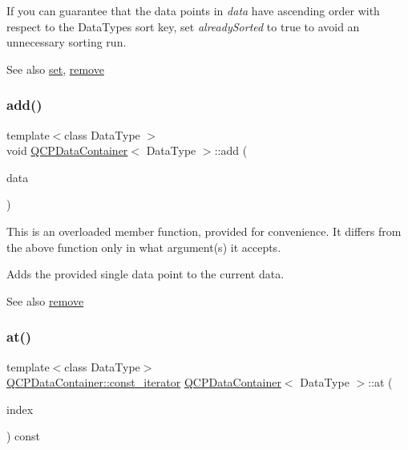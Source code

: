 If you can guarantee that the data points in {\itshape data} have ascending order with respect to the Data\+Type\textquotesingle{}s sort key, set {\itshape already\+Sorted} to true to avoid an unnecessary sorting run.

\begin{DoxySeeAlso}{See also}
\mbox{\hyperlink{class_q_c_p_data_container_ae7042bd534fc3ce7befa2ce3f790b5bf}{set}}, \mbox{\hyperlink{class_q_c_p_data_container_ae5f569a120648b167efa78835f12fd38}{remove}} 
\end{DoxySeeAlso}
\mbox{\label{class_q_c_p_data_container_a715e8e9972466804954a2f8fbd5288b7}} 
\subsubsection{\texorpdfstring{add()}{add()}\hspace{0.1cm}{\footnotesize\ttfamily [3/3]}}
{\footnotesize\ttfamily template$<$class Data\+Type $>$ \\
void \mbox{\hyperlink{class_q_c_p_data_container}{Q\+C\+P\+Data\+Container}}$<$ Data\+Type $>$\+::add (\begin{DoxyParamCaption}\item[{const Data\+Type \&}]{data }\end{DoxyParamCaption})}

This is an overloaded member function, provided for convenience. It differs from the above function only in what argument(s) it accepts.

Adds the provided single data point to the current data.

\begin{DoxySeeAlso}{See also}
\mbox{\hyperlink{class_q_c_p_data_container_ae5f569a120648b167efa78835f12fd38}{remove}} 
\end{DoxySeeAlso}
\mbox{\label{class_q_c_p_data_container_ae90c7457a052b223539906e6bddc0a92}} 
\subsubsection{\texorpdfstring{at()}{at()}}
{\footnotesize\ttfamily template$<$class Data\+Type$>$ \\
\mbox{\hyperlink{class_q_c_p_data_container_ae40a91f5cb0bcac61d727427449b7d15}{Q\+C\+P\+Data\+Container\+::const\+\_\+iterator}} \mbox{\hyperlink{class_q_c_p_data_container}{Q\+C\+P\+Data\+Container}}$<$ Data\+Type $>$\+::at (\begin{DoxyParamCaption}\item[{int}]{index }\end{DoxyParamCaption}) const\hspace{0.3cm}{\ttfamily [inline]}}

